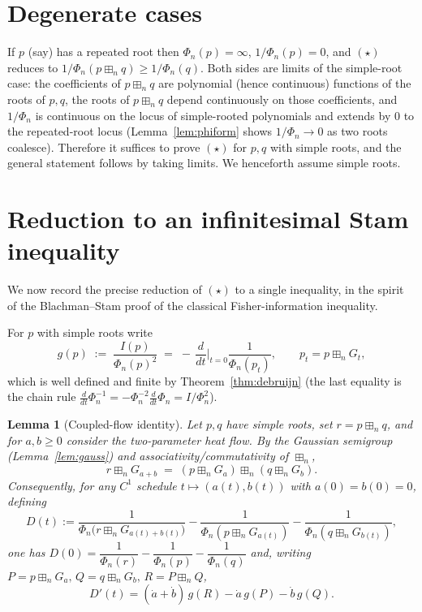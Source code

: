 \documentclass[12pt]{article}
\newtheorem{lemma}{Lemma}
\theoremstyle{remark}
\newcommand{\boxp}{\boxplus_n}
\begin{document}
\section{Degenerate cases}\label{sec:degenerate}

If $p$ (say) has a repeated root then $\Phi_n(p)=\infty$, $1/\Phi_n(p)=0$, and
$(\star)$ reduces to $1/\Phi_n(p\boxp q)\ge 1/\Phi_n(q)$.  Both sides are limits
of the simple-root case: the coefficients of $p\boxp q$ are polynomial (hence
continuous) functions of the roots of $p,q$, the roots of $p\boxp q$ depend
continuously on those coefficients, and $1/\Phi_n$ is continuous on the locus
of simple-rooted polynomials and extends by $0$ to the repeated-root locus
(Lemma~\ref{lem:phiform} shows $1/\Phi_n\to0$ as two roots coalesce).
Therefore it suffices to prove $(\star)$ for $p,q$ with simple roots, and the
general statement follows by taking limits.  We henceforth assume simple roots.

\section{Reduction to an infinitesimal Stam inequality}\label{sec:reduction}

We now record the precise reduction of $(\star)$ to a single inequality, in the
spirit of the Blachman--Stam proof of the classical Fisher-information
inequality.

For $p$ with simple roots write
\[
g(p)\;:=\;\frac{I(p)}{\Phi_n(p)^2}\;=\;-\,\frac{d}{dt}\Big|_{t=0}\frac{1}{\Phi_n(p_t)},
\qquad p_t=p\boxp G_t,
\]
which is well defined and finite by Theorem~\ref{thm:debruijn} (the last
equality is the chain rule
$\frac{d}{dt}\Phi_n^{-1}=-\Phi_n^{-2}\frac{d}{dt}\Phi_n=I/\Phi_n^2$).

\begin{lemma}[Coupled-flow identity]\label{lem:coupled}
Let $p,q$ have simple roots, set $r=p\boxp q$, and for $a,b\ge0$ consider the
two-parameter heat flow.  By the Gaussian semigroup
(Lemma~\ref{lem:gauss}) and associativity/commutativity of $\boxp$,
\[
r\boxp G_{a+b}\;=\;(p\boxp G_a)\boxp(q\boxp G_b).
\]
Consequently, for any $C^1$ schedule $t\mapsto(a(t),b(t))$ with
$a(0)=b(0)=0$, defining
\[
D(t):=\frac{1}{\Phi_n\!\big(r\boxp G_{a(t)+b(t)}\big)}
-\frac{1}{\Phi_n(p\boxp G_{a(t)})}-\frac{1}{\Phi_n(q\boxp G_{b(t)})},
\]
one has $D(0)=\dfrac{1}{\Phi_n(r)}-\dfrac{1}{\Phi_n(p)}-\dfrac{1}{\Phi_n(q)}$
and, writing $P=p\boxp G_{a},\,Q=q\boxp G_{b},\,R=P\boxp Q$,
\[
D'(t)=(\dot a+\dot b)\,g(R)-\dot a\,g(P)-\dot b\,g(Q). \tag{D}
\]
\end{lemma}
\end{document}
